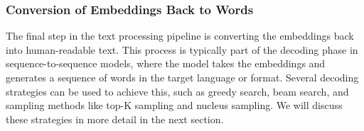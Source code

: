 \subsubsection{Conversion of Embeddings Back to Words}

The final step in the text processing pipeline is converting the embeddings back into human-readable text. This process is typically part of the decoding phase in sequence-to-sequence models, where the model takes the embeddings and generates a sequence of words in the target language or format. Several decoding strategies can be used to achieve this, such as greedy search, beam search, and sampling methods like top-K sampling and nucleus sampling. We will discuss these strategies in more detail in the next section.